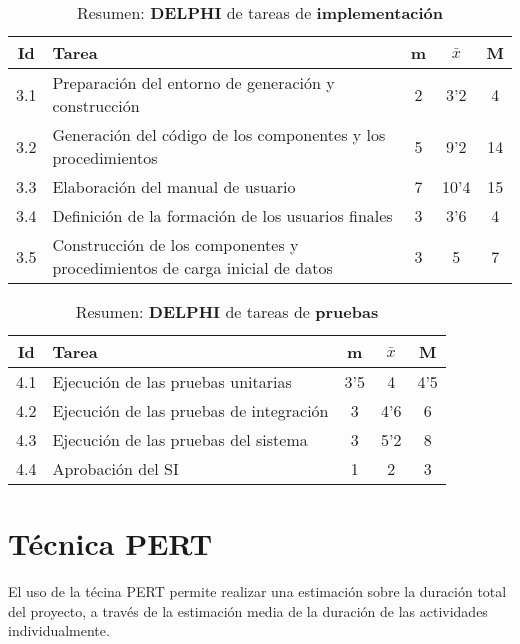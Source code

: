 \documentclass[11pt,a4paper,spanish,twoside]{report}
\begin{document}
\begin{table}[!h]
\centering
  \begin{tabular}{|c||p{8cm}||c|c|c|}
    \hline
    \textbf{Id} & \textbf{Tarea} & \textbf{m} & 
    \textbf{$\bar{x}$} &\textbf{M} \\
    \hline
    3.1 & Preparación del entorno de generación y construcción & 2 & 3'2  & 4 \\
    \hline
    3.2 & Generación del código de los componentes y los procedimientos & 5 &
    9'2 & 14\\
    \hline
    3.3 & Elaboración del manual de usuario & 7 & 10'4 & 15\\
    \hline
    3.4 & Definición de la formación de los usuarios finales & 3 & 3'6 & 4 \\
    \hline
    3.5 & Construcción de los componentes y procedimientos de carga inicial
    de datos & 3 & 5 & 7\\
    \hline
  \end{tabular}
  \caption{Resumen: \textbf{DELPHI} de tareas de \textbf{implementación}}
  \label{Tab:rDELPHIimp}
\end{table}

\begin{table}[!h]
\centering
  \begin{tabular}{|c||p{8cm}||c|c|c|}
    \hline
    \textbf{Id} & \textbf{Tarea} & \textbf{m} & 
    \textbf{$\bar{x}$} &\textbf{M} \\
    \hline
    4.1 & Ejecución de las pruebas unitarias & 3'5 & 4 & 4'5\\
    \hline
    4.2 & Ejecución de las pruebas de integración & 3 & 4'6 & 6\\
    \hline
    4.3 & Ejecución de las pruebas del sistema & 3 & 5'2 & 8\\
    \hline
    4.4 & Aprobación del SI & 1 & 2 & 3 \\
    \hline
  \end{tabular}
  \caption{Resumen: \textbf{DELPHI} de tareas de \textbf{pruebas}}
  \label{Tab:rDELPHIpru}
\end{table}


\chapter{Técnica PERT}
El uso de la técina PERT permite realizar una estimación sobre la duración
total del proyecto, a través de la estimación media de la duración de las
actividades individualmente.
\end{document}
